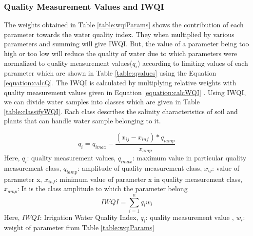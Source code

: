 \subsubsection{Quality Measurement Values and IWQI}
\label{subsubsection:calcIWQI}
The weights obtained in Table \ref{table:wqiParams} shows the contribution of each parameter towards the water quality index. They when multiplied by various parameters and summing will give IWQI. But, the value of a parameter being too high or too low will reduce the quality of water due to which parameters were normalized to quality measurement values($q_i$) according to limiting values of each parameter which are shown in Table \ref{table:qvalues}\cite{article:irrigationWaterQuality} using the Equation \ref{equation:calcQ}. The IWQI is calculated by multiplying relative weights with quality measurement values given in Equation \ref{equation:calcWQI} . Using IWQI, we can divide water samples into classes which are given in Table \ref{table:classifyWQI}\cite{article:irrigationWaterQuality}. Each class describes the salinity characteristics of soil and plants that can handle water sample belonging to it. 

\begin{equation}
\label{equation:calcQ}
    q_i = q_{imax} - \frac{(x_{ij} - x_{inf})*q_{iamp}}{x_{amp}}
\end{equation} 
Here, \newline
$q_i$: quality measurement values, \newline
$q_{imax}$: maximum value in particular quality measurement class, \newline	
$q_{iamp}$: amplitude of quality measurement class, \newline
$x_{ij}$: value of parameter x, \newline
$x_{inf}$: minimum value of parameter x in quality measurement class, \newline
$x_{amp}$: It is the class amplitude to which the parameter belong 	
\begin{equation}
\label{equation:calcWQI}
    IWQI = \sum_{i=1}^{n}q_iw_i
\end{equation}
Here, \newline
$IWQI$: Irrigation Water Quality Index, \newline
$q_i$: quality measurement value , \newline
$w_i$: weight of parameter from Table \ref{table:wqiParams}

